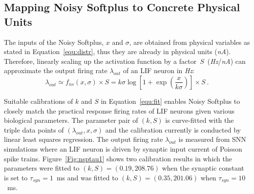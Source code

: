 \documentclass{article}
\begin{document}
\subsection{Mapping Noisy Softplus to Concrete Physical Units}
\label{sec:af_model}
The inputs of the Noisy Softplus, $x$ and $\sigma$, are obtained from physical variables as stated in Equation~\ref{equ:distr}, thus they are already in physical units (\textit{nA}).
Therefore, linearly scaling up the activation function by a factor~$S$~(\textit{Hz}/\textit{nA}) can approximate the output firing rate $\lambda_{out}$ of an LIF neuron in \textit{Hz}:
\begin{equation}
\lambda_{out} \simeq f_{ns}(x, \sigma) \times S = k \sigma \log [1 + \exp(\frac{x}{k \sigma})] \times S~.
\label{equ:fit}
\end{equation}	


Suitable calibrations of $k$ and $S$ in Equation~\ref{equ:fit} enables Noisy Softplus to closely match the practical response firing rates of LIF neurons given various biological parameters.
The parameter pair of $(k, S)$ is curve-fitted with the triple data points of $(\lambda_{out}, x, \sigma)$ and the calibration currently is conducted by linear least squares regression.
The output firing rate $\lambda_{out}$ is measured from SNN simulations where an LIF neuron is driven by synaptic input current of Poisson spike trains.
Figure~\ref{Fig:nsptau1} shows two calibration results in which 
the parameters were fitted to $(k, S)=(0.19,208.76)$ when the synaptic constant is set to $\tau_{syn}=1$~ms and was fitted to $(k, S)=(0.35,201.06)$ when $\tau_{syn}=10$~ms.
\end{document}
